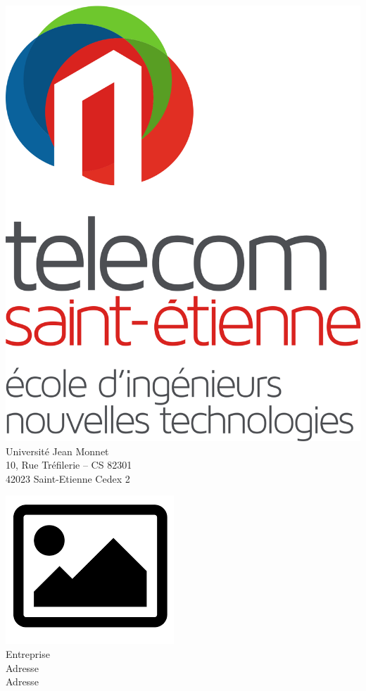 \thispagestyle{empty}

\begin{minipage}[t]{0.4\textwidth}
    \vspace*{-\baselineskip}
    \begin{flushleft}
        \includegraphics[scale=0.065]{image/logo_telecom.png}\\
        Université Jean Monnet\\
        10, Rue Tréfilerie – CS 82301\\
        42023 Saint-Etienne Cedex 2
    \end{flushleft}
\end{minipage}
\hfill
\begin{minipage}[t]{0.4\textwidth}
    \vspace*{-\baselineskip}
    \begin{flushright}
        \includegraphics[scale=0.175]{image/image.png}\\
        Entreprise\\
        Adresse\\
        Adresse
    \end{flushright}
\end{minipage}\\[0.3cm]

